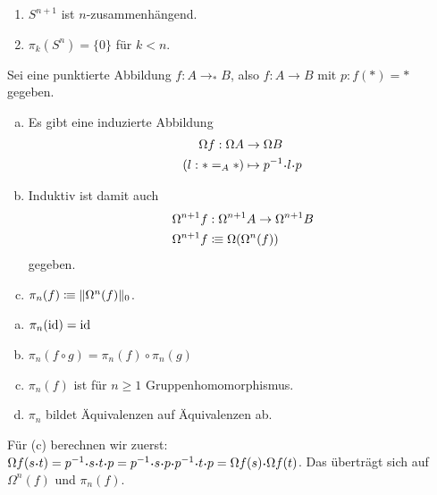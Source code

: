 \begin{korollar}
  \begin{enumerate}
  \item \(S^{n+1}\) ist \(n\)-zusammenhängend.
  \item \(\pi_k(S^n)=\{0\}\) für \(k<n\).
  \end{enumerate}
\end{korollar}

\begin{definition}
  Sei eine punktierte Abbildung \(f:A\to_\ast B\), also \(f:A\to B\) mit \({p:f(\ast)=\ast}\) gegeben.
  \begin{enumerate}[(a)]
  \item Es gibt eine induzierte Abbildung
    \begin{align*}
      \Omega f : \Omega A &\to \Omega B \\
      (l:\ast=_A\ast)&\mapsto p^{-1}\kon l\kon p
    \end{align*}
  \item Induktiv ist damit auch 
    \begin{align*}
      \Omega^{n+1} f &: \Omega^{n+1} A \to \Omega^{n+1} B \\
      \Omega^{n+1} f&\vcentcolon\mspace{-1.2mu}\equiv \Omega(\Omega^{n}(f))
    \end{align*}
    gegeben.
  \item \(\pi_n(f)\vcentcolon\mspace{-1.2mu}\equiv \|\Omega^n(f)\|_0\).
  \end{enumerate}
\end{definition}

\begin{lemma}
  \begin{enumerate}[(a)]
  \item \(\pi_n(\mathrm{id})=\mathrm{id}\)
  \item \(\pi_n(f\circ g)=\pi_n(f)\circ\pi_n(g)\)
  \item \(\pi_n(f)\) ist für \(n\geq 1\) Gruppenhomomorphismus.
  \item \(\pi_n\) bildet Äquivalenzen auf Äquivalenzen ab.
  \end{enumerate}
\end{lemma}

\begin{beweis}
  Für (c) berechnen wir zuerst:
  \(\Omega f(s\kon t)=p^{-1}\kon s\kon t\kon p=p^{-1}\kon s\kon p\kon p^{-1}\kon t\kon p=\Omega f(s)\kon\Omega f(t)\).
  Das überträgt sich auf \(\Omega^n(f)\) und \(\pi_n(f)\).
\end{beweis}

